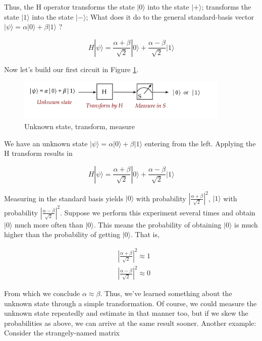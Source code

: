 \documentclass[main.tex]{subfiles}
\begin{document}
    Thus, the H operator transforms the state $|0\rangle$ into the state $|+\rangle$; transforms the state $|1\rangle$ into the state $|-\rangle$; What does it do to the general standard-basis vector $|\psi\rangle=\alpha|0\rangle+\beta|1\rangle$ ?
    
    $$
    H|\psi\rangle=\frac{\alpha+\beta}{\sqrt{2}}|0\rangle+\frac{\alpha-\beta}{\sqrt{2}}|1\rangle
    $$
    
    Now let's build our first circuit in Figure \ref{fig:21polarizer1b}.
    
    \begin{figure}
        \centering
        \includegraphics[width=4in]{notes/figs/n05/21gate3.png}
        \caption{Unknown state, transform, measure}
        \label{fig:21polarizer1b}
    \end{figure}
    
    We have an unknown state $|\psi\rangle=\alpha|0\rangle+\beta|1\rangle$ entering from the left. Applying the $\mathrm{H}$ transform results in
    
    $$
    H|\psi\rangle=\frac{\alpha+\beta}{\sqrt{2}}|0\rangle+\frac{\alpha-\beta}{\sqrt{2}}|1\rangle
    $$
    
    Measuring in the standard basis yields $|0\rangle$ with probability $\left|\frac{\alpha+\beta}{\sqrt{2}}\right|^{2}$, $|1\rangle$ with probability $\left|\frac{\alpha-\beta}{\sqrt{2}}\right|^{2}$. Suppose we perform this experiment several times and obtain $|0\rangle$ much more often than $|0\rangle$. This means the probability of obtaining $|0\rangle$ is much higher than the probability of getting $|0\rangle$. That is,
    
    $$
    \begin{aligned}
    &\left|\frac{\alpha+\beta}{\sqrt{2}}\right|^{2} \approx 1 \\
    &\left|\frac{\alpha-\beta}{\sqrt{2}}\right|^{2} \approx 0
    \end{aligned}
    $$
    
    From which we conclude $\alpha \approx \beta$. Thus, we've learned something about the unknown state through a simple transformation. Of course, we could measure the unknown state repeatedly and estimate in that manner too, but if we skew the probabilities as above, we can arrive at the same result sooner.
    Another example: Consider the strangely-named matrix
    
\end{document}
